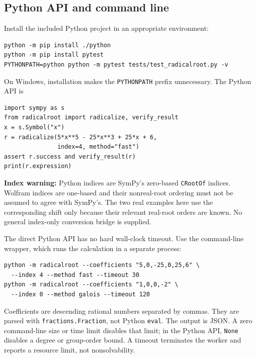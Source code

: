 \documentclass[11pt,a4paper]{article}
\newcommand{\code}[1]{\texttt{\small #1}}
\theoremstyle{definition}
\begin{document}
\subsection{Python API and command line}
Install the included Python project in an appropriate environment:
\begin{lstlisting}
python -m pip install ./python
python -m pip install pytest
PYTHONPATH=python python -m pytest tests/test_radicalroot.py -v
\end{lstlisting}
On Windows, installation makes the \code{PYTHONPATH} prefix unnecessary. The
Python API is
\begin{lstlisting}
import sympy as s
from radicalroot import radicalize, verify_result
x = s.Symbol("x")
r = radicalize(5*x**5 - 25*x**3 + 25*x + 6,
               index=4, method="fast")
assert r.success and verify_result(r)
print(r.expression)
\end{lstlisting}
\textbf{Index warning:} Python indices are SymPy's zero-based
\code{CRootOf} indices. Wolfram indices are one-based and their nonreal-root
ordering must not be assumed to agree with SymPy's. The two real examples here
use the corresponding shift only because their relevant real-root orders are
known. No general index-only conversion bridge is supplied.

The direct Python API has no hard wall-clock timeout. Use the command-line
wrapper, which runs the calculation in a separate process:
\begin{lstlisting}
python -m radicalroot --coefficients "5,0,-25,0,25,6" \
  --index 4 --method fast --timeout 30
python -m radicalroot --coefficients "1,0,0,-2" \
  --index 0 --method galois --timeout 120
\end{lstlisting}
Coefficients are descending rational numbers separated by commas. They are
parsed with \code{fractions.Fraction}, not Python \code{eval}. The output is JSON.
A zero command-line size or time limit disables that limit; in the Python API,
\code{None} disables a degree or group-order bound. A timeout terminates the
worker and reports a resource limit, not nonsolvability.
\end{document}
